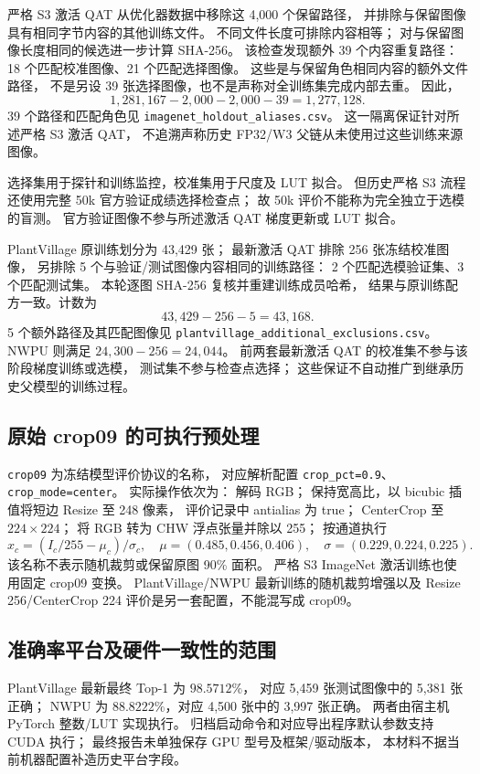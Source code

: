 严格 S3 激活 QAT 从优化器数据中移除这 4,000 个保留路径，
并排除与保留图像具有相同字节内容的其他训练文件。
不同文件长度可排除内容相等；
对与保留图像长度相同的候选进一步计算 SHA-256。
该检查发现额外 39 个内容重复路径：
18 个匹配校准图像、21 个匹配选择图像。
这些是与保留角色相同内容的额外文件路径，
不是另设 39 张选择图像，也不是声称对全训练集完成内部去重。
因此，
\[
1{,}281{,}167-2{,}000-2{,}000-39=1{,}277{,}128.
\]
39 个路径和匹配角色见 \texttt{imagenet\_holdout\_aliases.csv}。
这一隔离保证针对所述严格 S3 激活 QAT，
不追溯声称历史 FP32/W3 父链从未使用过这些训练来源图像。

选择集用于探针和训练监控，校准集用于尺度及 LUT 拟合。
但历史严格 S3 流程还使用完整 50k 官方验证成绩选择检查点；
故 50k 评价不能称为完全独立于选模的盲测。
官方验证图像不参与所述激活 QAT 梯度更新或 LUT 拟合。

PlantVillage 原训练划分为 43,429 张；
最新激活 QAT 排除 256 张冻结校准图像，
另排除 5 个与验证/测试图像内容相同的训练路径：
2 个匹配选模验证集、3 个匹配测试集。
本轮逐图 SHA-256 复核并重建训练成员哈希，
结果与原训练配方一致。计数为
\[
43{,}429-256-5=43{,}168.
\]
5 个额外路径及其匹配图像见
\texttt{plantvillage\_additional\_exclusions.csv}。
NWPU 则满足 $24{,}300-256=24{,}044$。
前两套最新激活 QAT 的校准集不参与该阶段梯度训练或选模，
测试集不参与检查点选择；
这些保证不自动推广到继承历史父模型的训练过程。

\subsection{原始 crop09 的可执行预处理}
\texttt{crop09} 为冻结模型评价协议的名称，
对应解析配置 \texttt{crop\_pct=0.9}、\texttt{crop\_mode=center}。
实际操作依次为：
解码 RGB；
保持宽高比，以 bicubic 插值将短边 Resize 至 248 像素，
评价记录中 antialias 为 true；
CenterCrop 至 $224\times224$；
将 RGB 转为 CHW 浮点张量并除以 255；
按通道执行
\[
x_c=(I_c/255-\mu_c)/\sigma_c,
\quad
\mu=(0.485,0.456,0.406),
\quad
\sigma=(0.229,0.224,0.225).
\]
该名称不表示随机裁剪或保留原图 90\% 面积。
严格 S3 ImageNet 激活训练也使用固定 crop09 变换。
PlantVillage/NWPU 最新训练的随机裁剪增强以及
Resize 256/CenterCrop 224 评价是另一套配置，不能混写成 crop09。

\subsection{准确率平台及硬件一致性的范围}
PlantVillage 最新最终 Top-1 为 $98.5712\%$，
对应 5,459 张测试图像中的 5,381 张正确；
NWPU 为 $88.8222\%$，对应 4,500 张中的 3,997 张正确。
两者由宿主机 PyTorch 整数/LUT 实现执行。
归档启动命令和对应导出程序默认参数支持 CUDA 执行；
最终报告未单独保存 GPU 型号及框架/驱动版本，
本材料不据当前机器配置补造历史平台字段。

